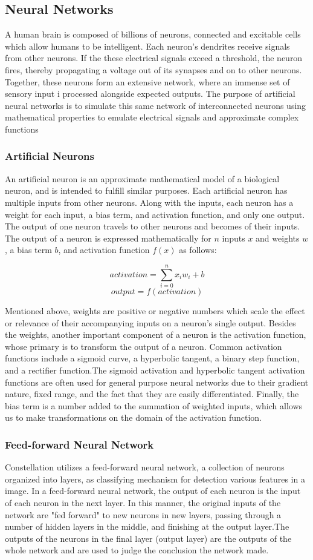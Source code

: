 \subsection{Neural Networks}
A human brain is composed of billions of neurons, connected and excitable cells which allow humans to be intelligent. Each neuron's dendrites receive signals from other neurons. If the these electrical signals exceed a threshold, the neuron fires, thereby propagating a voltage out of its synapses and on to other neurons. Together, these neurons form an extensive network, where an immense set of sensory input i processed alongside expected outputs. The purpose of artificial neural networks is to simulate this same network of interconnected neurons using mathematical properties to emulate electrical signals and approximate complex functions
\subsubsection{Artificial Neurons}

An artificial neuron is an approximate mathematical model of a biological neuron, and is intended to fulfill similar purposes. Each artificial neuron has multiple inputs from other neurons. Along with the inputs, each neuron has a weight for each input, a bias term, and activation function, and only one output. The output of one neuron travels to other neurons and becomes of their inputs. The output of a neuron is expressed mathematically for $n$ inputs $x$ and weights $w$, a bias term $b$, and activation function $f(x)$ as follows:


$$activation = \sum\limits_{i=0}^n x_i w_i+b$$
$$output = f(activation)$$

Mentioned above, weights are positive or negative numbers which scale the effect or relevance of their accompanying inputs on a neuron's single output. Besides the weights, another important component of a neuron is the activation function, whose primary is to transform the output of a neuron. Common activation functions include a sigmoid curve, a hyperbolic tangent, a binary step function, and a rectifier function.The sigmoid activation and hyperbolic tangent activation functions are often used for general purpose neural networks due to their gradient nature, fixed range, and the fact that they are easily differentiated. Finally, the bias term is a number added to the summation of weighted inputs, which allows us to make transformations on the domain of the activation function.

\subsubsection{Feed-forward Neural Network}
Constellation utilizes a feed-forward neural network, a collection of neurons organized into layers, as classifying mechanism for detection various features in a image. In a feed-forward neural network, the output of each neuron is the input of each neuron in the next layer. In this manner, the original inputs of the network are "fed forward" to new neurons in new layers, passing through a number of hidden layers in the middle, and finishing at the output layer.The outputs of the neurons in the final layer (output layer) are the outputs of the whole network and are used to judge the conclusion the network made.
